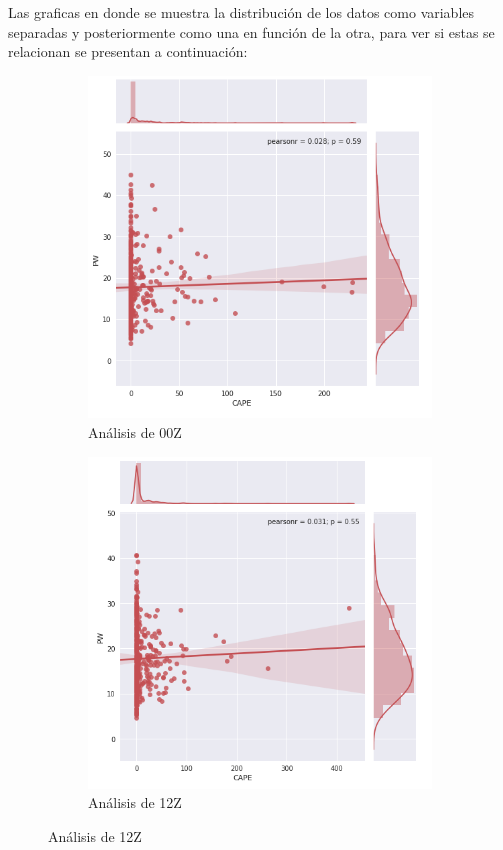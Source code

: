 \documentclass[12pt]{article}
\begin{document}
Las graficas en donde se muestra la distribución de los datos como variables separadas y posteriormente como una en función de la otra, para ver si estas se relacionan se presentan a continuación:

\begin{figure}[h!]
\begin{subfigure}{.4\textwidth}
  \centering
  \includegraphics[width=.8\linewidth]{joint_00Z.png}
  \caption{Análisis de 00Z}
  \label{fig:sfig1}
\end{subfigure}
\begin{subfigure}{.4\textwidth}
  \centering
  \includegraphics[width=.8\linewidth]{joint_12Z.png}
  \caption{Análisis de 12Z}
  \label{fig:sfig2}
\end{subfigure}
\end{figure}
\end{document}
